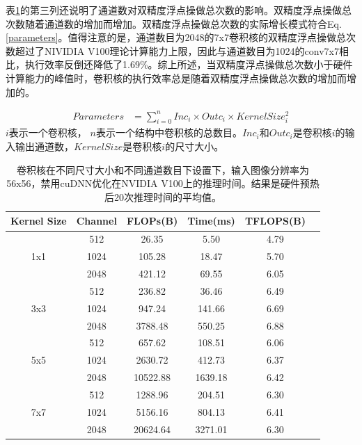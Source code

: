 表\ref{channel}的第三列还说明了通道数对双精度浮点操做总次数的影响。双精度浮点操做总次数随着通道数的增加而增加。双精度浮点操做总次数的实际增长模式符合Eq.\ref{parameters}。值得注意的是，通道数目为2048的7x7卷积核的双精度浮点操做总次数超过了NIVIDIA V100理论计算能力上限，因此与通道数目为1024的conv7x7相比，执行效率反倒还降低了1.69\%。综上所述，当双精度浮点操做总次数小于硬件计算能力的峰值时，卷积核的执行效率总是随着双精度浮点操做总次数的增加而增加的。

\begin{equation}
\begin{aligned}
\label{parameters}
Parameters &= \sum_{i=0}^n Inc_i \times Outc_i \times KernelSize_i^{2}
\end{aligned}
\end{equation}
$i$表示一个卷积核， $n$表示一个结构中卷积核的总数目。$Inc_i$和$Outc_i$是卷积核$i$的输入输出通道数，$KernelSize$是卷积核$i$的尺寸大小。

\begin{table}[h]
	\caption{
		卷积核在不同尺寸大小和不同通道数目下设置下，输入图像分辨率为56x56，禁用cuDNN优化在NVIDIA V100上的推理时间。结果是硬件预热后20次推理时间的平均值。}
	\label{channel}
	\centering
	\begin{tabular}{cccccc}
		\hline
		\textbf{Kernel Size} & \textbf{Channel} & \textbf{FLOPs(B)} & \textbf{Time(ms)} & \textbf{TFLOPS(B)} \\
		\hline
		\multirow{3}{*}{1x1}
		&512	&26.35 &5.50	&4.79	\\
		&1024	&105.28	&18.47	&5.70	\\
		&2048	&421.12	&69.55	&6.05	\\
		
		\hline
		\multirow{3}{*}{3x3}
		&512	&236.82	&36.46	&6.49	\\
		&1024	&947.24	&141.66	&6.69	\\
		&2048	&3788.48	&550.25	&6.88	\\
		
		\hline
		\multirow{3}{*}{5x5}
		&512	&657.62	&108.51	&6.06	\\
		&1024	&2630.72	&412.73	&6.37	\\
		&2048	&10522.88 &1639.18	&6.42	\\
		
		\hline
		\multirow{3}{*}{7x7}
		&512	&1288.96	&204.51	&6.30	\\
		&1024	&5156.16	&804.13	&6.41	\\
		&2048	&20624.64 &3271.01	&6.30	\\
		
		\hline
	\end{tabular}
\end{table}

